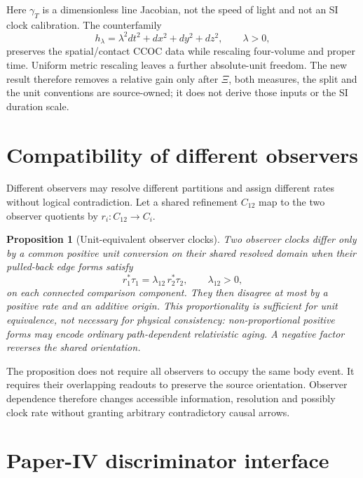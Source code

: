 \documentclass[11pt]{article}
\newtheorem{proposition}{Proposition}
\begin{document}
Here $\gamma_T$ is a dimensionless line Jacobian, not the speed of light and
not an SI clock calibration.  The counterfamily
\begin{equation}
 h_\lambda=\lambda^2dt^2+dx^2+dy^2+dz^2,
 \qquad \lambda>0,
 \label{eq:common-line-counterfamily}
\end{equation}
preserves the spatial/contact CCOC data while rescaling four-volume and proper
time.  Uniform metric rescaling leaves a further absolute-unit freedom.  The
new result therefore removes a relative gain only after $\Xi$, both measures,
the split and the unit conventions are source-owned; it does not derive those
inputs or the SI duration scale.

\section{Compatibility of different observers}

Different observers may resolve different partitions and assign different
rates without logical contradiction. Let a shared refinement \(C_{12}\) map
to the two observer quotients by \(r_i:C_{12}\to C_i\).

\begin{proposition}[Unit-equivalent observer clocks]
Two observer clocks differ only by a common positive unit conversion on their
shared resolved domain when their pulled-back edge forms satisfy
\begin{equation}
 r_1^*\tau_1=\lambda_{12}\,r_2^*\tau_2,
 \qquad \lambda_{12}>0,
 \label{eq:observer-compatibility}
\end{equation}
on each connected comparison component. They then disagree at most by a
positive rate and an additive origin. This proportionality is sufficient for
unit equivalence, not necessary for physical consistency: non-proportional
positive forms may encode ordinary path-dependent relativistic aging. A
negative factor reverses the shared orientation.
\end{proposition}

The proposition does not require all observers to occupy the same body event.
It requires their overlapping readouts to preserve the source orientation.
Observer dependence therefore changes accessible information, resolution and
possibly clock rate without granting arbitrary contradictory causal arrows.

\section{Paper-IV discriminator interface}
\end{document}
